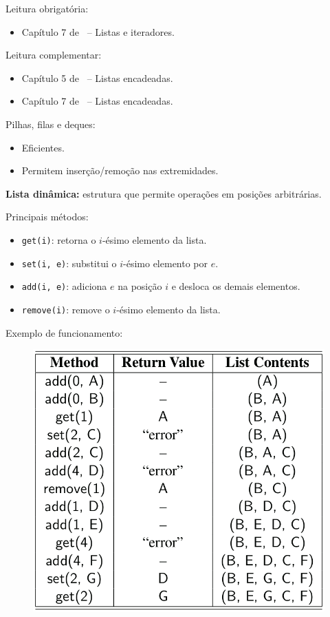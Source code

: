 \newcommand{\templatesdir}{../../../templates}
\newcommand{\template}{template-roteiro-est}


\newcommand{\content}{Listas dinâmicas}
\newcommand{\class}{Algoritmos e Estruturas de Dados}
\newcommand{\shortcourse}{45EST}



\makeheader

{
Leitura obrigatória:
\begin{itemize}
	\item Capítulo 7 de~\cite{GoodrichEtAl2014} -- Listas e iteradores.
\end{itemize}

Leitura complementar:
\begin{itemize}
	\item Capítulo 5 de~\cite{Lafore2004} -- Listas encadeadas.
	\item Capítulo 7 de~\cite{Pereira2008} -- Listas encadeadas.
\end{itemize}
}

\medskip


Pilhas, filas e deques:
\begin{itemize}
	\item Eficientes. 
	\item Permitem inserção/remoção nas extremidades.
\end{itemize}

\textbf{Lista dinâmica:} estrutura que permite operações em posições arbitrárias.

\medskip

Principais métodos:
\begin{itemize}
	\item \texttt{get(i)}: retorna o $i$-ésimo elemento da lista.
	\item \texttt{set(i,\,e)}: substitui o $i$-ésimo elemento por $e$.
	\item \texttt{add(i,\,e)}: adiciona $e$ na posição $i$ e desloca os demais elementos.
	\item \texttt{remove(i)}: remove o $i$-ésimo elemento da lista.
\end{itemize}

\clearpage

Exemplo de funcionamento:

\begin{figure}[H]
	\centering
	\includegraphics[width=0.5\linewidth]{img/table-7-1}
\end{figure}

